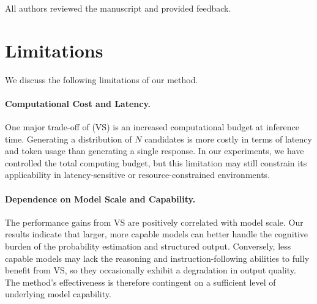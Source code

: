 All authors reviewed the manuscript and provided feedback. 

\section{Limitations}\label{sec:limitations}

We discuss the following limitations of our method. %

\paragraph{Computational Cost and Latency.}
One major trade-off of \ours (VS) is an increased computational budget at inference time. Generating a distribution of $N$ candidates is more costly in terms of latency and token usage than generating a single response. In our experiments, we have controlled the total computing budget, but this limitation may still constrain its applicability in latency-sensitive or resource-constrained environments. 

\paragraph{Dependence on Model Scale and Capability.}
The performance gains from VS are positively correlated with model scale. Our results indicate that larger, more capable models can better handle the cognitive burden of the probability estimation and structured output. Conversely, less capable models may lack the reasoning and instruction-following abilities to fully benefit from VS, so they occasionally exhibit a degradation in output quality. The method's effectiveness is therefore contingent on a sufficient level of underlying model capability.


